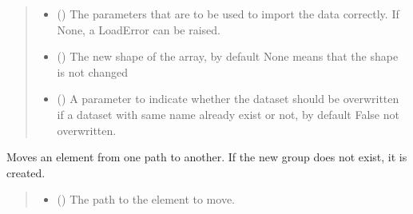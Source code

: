\documentclass[letterpaper,10pt,english]{sphinxmanual}
\begin{document}
\begin{fulllineitems}
\begin{fulllineitems}
\begin{quote}
\begin{description}
\begin{itemize}
\item {} 
\sphinxAtStartPar
{} (\sphinxstyleliteralemphasis{\sphinxupquote{, }}) \textendash{} The parameters that are to be used to import the data correctly.  If None, a LoadError can be raised.

\item {} 
\sphinxAtStartPar
{} (\sphinxstyleliteralemphasis{\sphinxupquote{, }}) \textendash{} The new shape of the array, by default None means that the shape is not changed

\item {} 
\sphinxAtStartPar
{} (\sphinxstyleliteralemphasis{\sphinxupquote{, }}) \textendash{} A parameter to indicate whether the dataset should be overwritten if a dataset with same name already exist or not, by default False \sphinxhyphen{} not overwritten.

\end{itemize}

\end{description}\end{quote}

\end{fulllineitems}


\begin{fulllineitems}
\label{\detokenize{source/_autosummary/HDF5_BLS.Wrapper:HDF5_BLS.Wrapper.move}}
\pysigstartsignatures
\pysiglinewithargsret
{}
{\sphinxparamcomma {}}
{}
\pysigstopsignatures
\sphinxAtStartPar
Moves an element from one path to another. If the new group does not exist, it is created.
\begin{quote}\begin{description}
\begin{itemize}
\item {} 
\sphinxAtStartPar
{} () \textendash{} The path to the element to move.


\end{itemize}
\end{description}
\end{quote}
\end{fulllineitems}
\end{fulllineitems}
\end{document}
